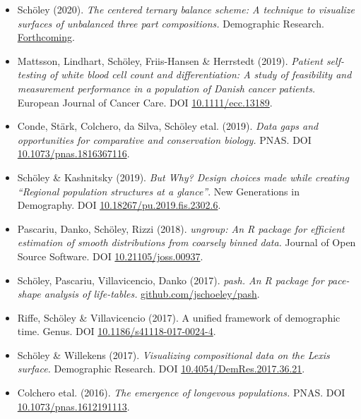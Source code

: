 \documentclass[
  10pt, twoside
]{book}
\begin{document}
\begin{itemize}
\item Schöley (2020). \emph{The centered ternary balance scheme: A technique to visualize surfaces of unbalanced three part compositions.} Demographic Research. \href{https://github.com/jschoeley/ctbs}{Forthcoming}.
\item Mattsson, Lindhart, Schöley, Friis-Hansen \& Herrstedt (2019). \emph{Patient self-testing of white blood cell count and differentiation: A study of feasibility and measurement performance in a population of Danish cancer patients.} European Journal of Cancer Care. DOI \href{https://onlinelibrary.wiley.com/doi/full/10.1111/ecc.13189}{10.1111/ecc.13189}.
\item Conde, Stärk, Colchero, da Silva, Schöley etal. (2019). \emph{Data gaps and opportunities for comparative and conservation biology.} PNAS. DOI \href{https://www.pnas.org/content/116/19/9658}{10.1073/pnas.1816367116}.
\item Schöley \& Kashnitsky (2019). \emph{But Why? Design choices made while creating ``Regional population structures at a glance''}. New Generations in Demography. DOI \href{https://oeconomica.vse.cz/vydavani-publikaci/informace-pro-ctenare/seznam-vsech-vydanych-titulu/publikace-2018-az-2002/jakub-fischer-petr-mazouch-klara-hulikova-tesarkova-olga-kurtinova-new-generations-in-demography-new-challenging-adventures-in-the-population-science/}{10.18267/pu.2019.fis.2302.6}.
\item Pascariu, Danko, Schöley, Rizzi (2018). \emph{ungroup: An R package for efficient estimation of smooth distributions from coarsely binned data.} Journal of Open Source Software. DOI \href{https://joss.theoj.org/papers/10.21105/joss.00937}{10.21105/joss.00937}.
\item Schöley, Pascariu, Villavicencio, Danko (2017). \emph{pash. An R package for pace-shape analysis of life-tables.} \href{https://github.com/jschoeley/pash}{github.com/jschoeley/pash}.
\item Riffe, Schöley \& Villavicencio (2017). A unified framework of demographic time. Genus. DOI \href{https://genus.springeropen.com/articles/10.1186/s41118-017-0024-4}{10.1186/s41118-017-0024-4}.
\item Schöley \& Willekens (2017). \emph{Visualizing compositional data on the Lexis surface.} Demographic Research. DOI \href{https://www.demographic-research.org/volumes/vol36/21/}{10.4054/DemRes.2017.36.21}.
\item Colchero etal. (2016). \emph{The emergence of longevous populations.} PNAS. DOI \href{https://www.pnas.org/content/113/48/E7681}{10.1073/pnas.1612191113}.
\end{itemize}
\clearpage
\end{document}
